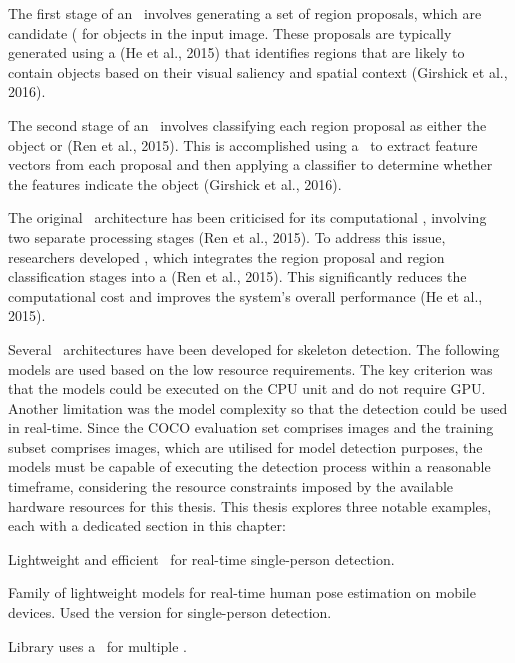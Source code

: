 \startitemize[1]
 \item {} The first stage of an \RCNN\ involves generating a set of region proposals, which are candidate  (\BBOX\) for objects in the input image. These proposals are typically generated using a  (\scc He et al., 2015) that identifies regions that are likely to contain objects based on their visual saliency and spatial context (\scc Girshick et al., 2016).
 \item {} The second stage of an \RCNN\ involves classifying each region proposal as either  the ob\-ject or  (\scc Ren et al., 2015). This is accomplished using a \CNN\ to extract feature vectors from each proposal and then applying a classifier to determine whether the features indicate the ob\-ject (\scc Girshick et al., 2016).
\stopitemize

The original \RCNN\ architecture has been criticised for its computational , involving two separate processing stages (\scc Ren et al., 2015). To address this issue, researchers developed , which integrates the region proposal and region classification stages into a  (\scc Ren et al., 2015). This significantly reduces the computational cost and improves the system's overall performance (\scc He et al., 2015).

Several \NN\ architectures have been developed for skeleton detection. The following models are used based on the low resource requirements. The key criterion was that the models could be executed on the CPU unit and do not require GPU. Another limitation was the model complexity so that the detection could be used in real-time. Since the COCO evaluation set comprises  images and the training subset comprises  images, which are utilised for model detection purposes, the models must be capable of executing the detection process within a reasonable timeframe, considering the resource constraints imposed by the available hardware resources for this thesis. This thesis explores three notable examples, each with a dedicated section in this chapter:

\startitemize[n]
 \item {} Lightweight and efficient \CNN\ for real-time single-person detection.
 \item {} Family of lightweight models for real-time human pose es\-timation on mobile devices. Used the  version for single-person detection.
 \item {} Library uses a \CNN\ for multiple \HPE.
\stopitemize

